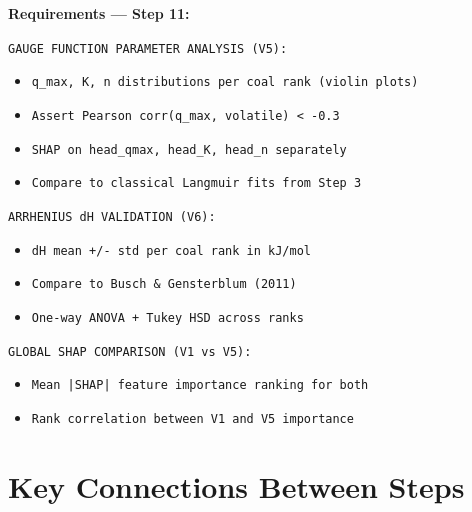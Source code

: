 \documentclass[12pt,a4paper]{article}
\begin{document}
\begin{promptbox}
\textbf{Requirements --- Step 11:}

\texttt{GAUGE FUNCTION PARAMETER ANALYSIS (V5):}
\begin{itemize}[noitemsep]
  \item \texttt{q\_max, K, n distributions per coal rank (violin plots)}
  \item \texttt{Assert Pearson corr(q\_max, volatile) < -0.3}
  \item \texttt{SHAP on head\_qmax, head\_K, head\_n separately}
  \item \texttt{Compare to classical Langmuir fits from Step 3}
\end{itemize}

\texttt{ARRHENIUS dH VALIDATION (V6):}
\begin{itemize}[noitemsep]
  \item \texttt{dH mean +/- std per coal rank in kJ/mol}
  \item \texttt{Compare to Busch \& Gensterblum (2011)}
  \item \texttt{One-way ANOVA + Tukey HSD across ranks}
\end{itemize}

\texttt{GLOBAL SHAP COMPARISON (V1 vs V5):}
\begin{itemize}[noitemsep]
  \item \texttt{Mean |SHAP| feature importance ranking for both}
  \item \texttt{Rank correlation between V1 and V5 importance}
\end{itemize}
\end{promptbox}

\section{Key Connections Between Steps}
\end{document}
